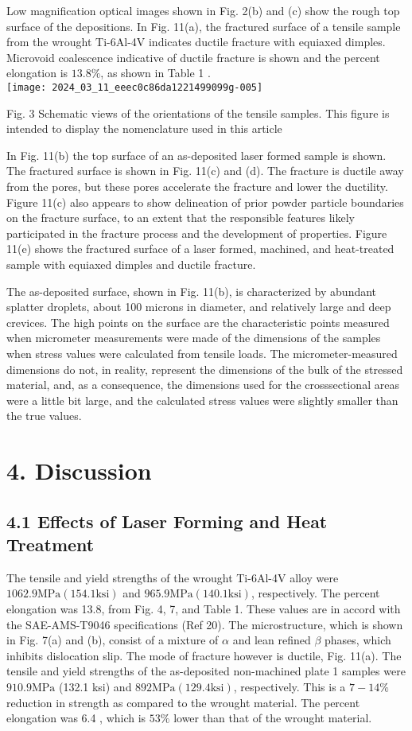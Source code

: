 \documentclass[10pt]{article}
\begin{document}
Low magnification optical images shown in Fig. 2(b) and (c) show the rough top surface of the depositions. In Fig. 11(a), the fractured surface of a tensile sample from the wrought Ti-6Al-4V indicates ductile fracture with equiaxed dimples. Microvoid coalescence indicative of ductile fracture is shown and the percent elongation is $13.8 \%$, as shown in Table 1 .\\
\texttt{[image: 2024\_03\_11\_eeec0c86da1221499099g-005]}

Fig. 3 Schematic views of the orientations of the tensile samples. This figure is intended to display the nomenclature used in this article

In Fig. 11(b) the top surface of an as-deposited laser formed sample is shown. The fractured surface is shown in Fig. 11(c) and (d). The fracture is ductile away from the pores, but these pores accelerate the fracture and lower the ductility. Figure 11(c) also appears to show delineation of prior powder particle boundaries on the fracture surface, to an extent that the responsible features likely participated in the fracture process and the development of properties. Figure 11(e) shows the fractured surface of a laser formed, machined, and heat-treated sample with equiaxed dimples and ductile fracture.

The as-deposited surface, shown in Fig. 11(b), is characterized by abundant splatter droplets, about 100 microns in diameter, and relatively large and deep crevices. The high points on the surface are the characteristic points measured when micrometer measurements were made of the dimensions of the samples when stress values were calculated from tensile loads. The micrometer-measured dimensions do not, in reality, represent the dimensions of the bulk of the stressed material, and, as a consequence, the dimensions used for the crosssectional areas were a little bit large, and the calculated stress values were slightly smaller than the true values.

\section*{4. Discussion}
\subsection*{4.1 Effects of Laser Forming and Heat Treatment}
The tensile and yield strengths of the wrought Ti-6Al-4V alloy were $1062.9 \mathrm{MPa}(154.1 \mathrm{ksi})$ and $965.9 \mathrm{MPa}(140.1 \mathrm{ksi})$, respectively. The percent elongation was 13.8, from Fig. 4, 7, and Table 1. These values are in accord with the SAE-AMS-T9046 specifications (Ref 20). The microstructure, which is shown in Fig. 7(a) and (b), consist of a mixture of $\alpha$ and lean refined $\beta$ phases, which inhibits dislocation slip. The mode of fracture however is ductile, Fig. 11(a). The tensile and yield strengths of the as-deposited non-machined plate 1 samples were $910.9 \mathrm{MPa}$ (132.1 ksi) and $892 \mathrm{MPa}(129.4 \mathrm{ksi})$, respectively. This is a $7-14 \%$ reduction in strength as compared to the wrought material. The percent elongation was 6.4 , which is $53 \%$ lower than that of the wrought material.
\end{document}
